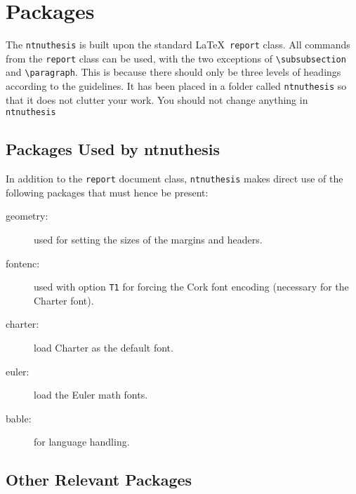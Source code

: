 \chapter{Packages}
\label{chap:packages}

The \texttt{ntnuthesis} is built upon the standard \LaTeX\
\texttt{report} class. All commands from the \texttt{report} class can
be used, with the two exceptions of \verb+\subsubsection+ and
\verb+\paragraph+. This is because there should only be three
levels of headings according to the guidelines. 
It has been placed in a folder called \texttt{ntnuthesis} so that it does not
clutter your work.  You should not change anything in \texttt{ntnuthesis}

\section{Packages Used by ntnuthesis}
\label{sec:packages}

In addition to the \texttt{report} document class,
\texttt{ntnuthesis} makes direct use of the following packages
that must hence be present:
\begin{description}
	\item[geometry:] used for setting the sizes of the margins and
  	headers.
	\item[fontenc:] used with option \texttt{T1} for forcing the Cork font
  	encoding (necessary for the Charter font).
	\item[charter:] load Charter as the default font.
	\item[euler:] load the Euler math fonts.
	\item[bable:] for language handling.
\end{description}

\section{Other Relevant Packages}
\label{sec:otherpackages}

